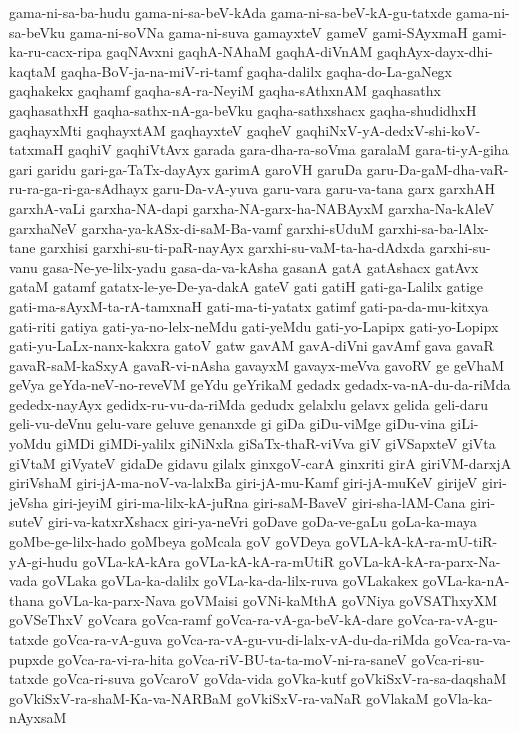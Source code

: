 {gama-ni-sa-ba-hudu
gama-ni-sa-beV-kAda
gama-ni-sa-beV-kA-gu-tatxde
gama-ni-sa-beVku
gama-ni-soVNa
gama-ni-suva
gamayxteV
gameV
gami-SAyxmaH
gami-ka-ru-cacx-ripa
gaqNAvxni
gaqhA-NAhaM
gaqhA-diVnAM
gaqhAyx-dayx-dhi-kaqtaM
gaqha-BoV-ja-na-miV-ri-tamf
gaqha-dalilx
gaqha-do-La-gaNegx
gaqhakekx
gaqhamf
gaqha-sA-ra-NeyiM
gaqha-sAthxnAM
gaqhasathx
gaqhasathxH
gaqha-sathx-nA-ga-beVku
gaqha-sathxshacx
gaqha-shudidhxH
gaqhayxMti
gaqhayxtAM
gaqhayxteV
gaqheV
gaqhiNxV-yA-dedxV-shi-koV-tatxmaH
gaqhiV
gaqhiVtAvx
garada
gara-dha-ra-soVma
garalaM
gara-ti-yA-giha
gari
garidu
gari-ga-TaTx-dayAyx
garimA
garoVH
garuDa
garu-Da-gaM-dha-vaR-ru-ra-ga-ri-ga-sAdhayx
garu-Da-vA-yuva
garu-vara
garu-va-tana
garx
garxhAH
garxhA-vaLi
garxha-NA-dapi
garxha-NA-garx-ha-NABAyxM
garxha-Na-kAleV
garxhaNeV
garxha-ya-kASx-di-saM-Ba-vamf
garxhi-sUduM
garxhi-sa-ba-lAlx-tane
garxhisi
garxhi-su-ti-paR-nayAyx
garxhi-su-vaM-ta-ha-dAdxda
garxhi-su-vanu
gasa-Ne-ye-lilx-yadu
gasa-da-va-kAsha
gasanA
gatA
gatAshacx
gatAvx
gataM
gatamf
gatatx-le-ye-De-ya-dakA
gateV
gati
gatiH
gati-ga-Lalilx
gatige
gati-ma-sAyxM-ta-rA-tamxnaH
gati-ma-ti-yatatx
gatimf
gati-pa-da-mu-kitxya
gati-riti
gatiya
gati-ya-no-lelx-neMdu
gati-yeMdu
gati-yo-Lapipx
gati-yo-Lopipx
gati-yu-LaLx-nanx-kakxra
gatoV
gatw
gavAM
gavA-diVni
gavAmf
gava
gavaR
gavaR-saM-kaSxyA
gavaR-vi-nAsha
gavayxM
gavayx-meVva
gavoRV
ge
geVhaM
geVya
geYda-neV-no-reveVM
geYdu
geYrikaM
gedadx
gedadx-va-nA-du-da-riMda
gededx-nayAyx
gedidx-ru-vu-da-riMda
gedudx
gelalxlu
gelavx
gelida
geli-daru
geli-vu-deVnu
gelu-vare
geluve
genanxde
gi
giDa
giDu-viMge
giDu-vina
giLi-yoMdu
giMDi
giMDi-yalilx
giNiNxla
giSaTx-thaR-viVva
giV
giVSapxteV
giVta
giVtaM
giVyateV
gidaDe
gidavu
gilalx
ginxgoV-carA
ginxriti
girA
giriVM-darxjA
giriVshaM
giri-jA-ma-noV-va-lalxBa
giri-jA-mu-Kamf
giri-jA-muKeV
girijeV
giri-jeVsha
giri-jeyiM
giri-ma-lilx-kA-juRna
giri-saM-BaveV
giri-sha-lAM-Cana
giri-suteV
giri-va-katxrXshacx
giri-ya-neVri
goDave
goDa-ve-gaLu
goLa-ka-maya
goMbe-ge-lilx-hado
goMbeya
goMcala
goV
goVDeya
goVLA-kA-kA-ra-mU-tiR-yA-gi-hudu
goVLa-kA-kAra
goVLa-kA-kA-ra-mUtiR
goVLa-kA-kA-ra-parx-Na-vada
goVLaka
goVLa-ka-dalilx
goVLa-ka-da-lilx-ruva
goVLakakex
goVLa-ka-nA-thana
goVLa-ka-parx-Nava
goVMaisi
goVNi-kaMthA
goVNiya
goVSAThxyXM
goVSeThxV
goVcara
goVca-ramf
goVca-ra-vA-ga-beV-kA-dare
goVca-ra-vA-gu-tatxde
goVca-ra-vA-guva
goVca-ra-vA-gu-vu-di-lalx-vA-du-da-riMda
goVca-ra-va-pupxde
goVca-ra-vi-ra-hita
goVca-riV-BU-ta-ta-moV-ni-ra-saneV
goVca-ri-su-tatxde
goVca-ri-suva
goVcaroV
goVda-vida
goVka-kutf
goVkiSxV-ra-sa-daqshaM
goVkiSxV-ra-shaM-Ka-va-NARBaM
goVkiSxV-ra-vaNaR
goVlakaM
goVla-ka-nAyxsaM
}
